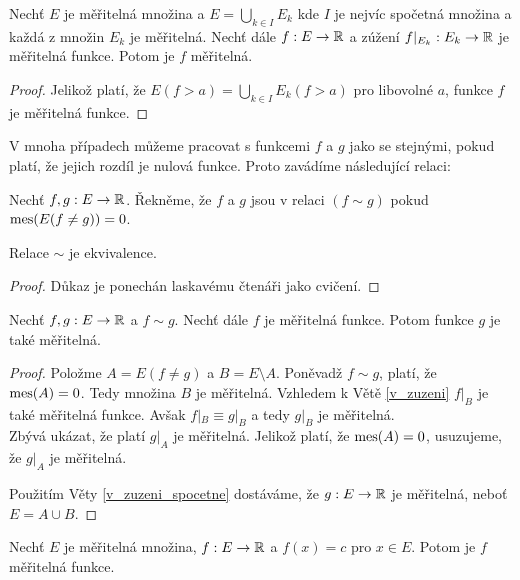 \begin{theorem}
Nechť $E$ je měřitelná množina a $E=\bigcup\limits_{k \in I} E_k$ kde $I$ je nejvíc spočetná množina a každá z množin $E_k$ je měřitelná.
Nechť dále $f:E \to \mathbb{R}$ a zúžení $f|_{E_k}:E_k \to \mathbb{R}$ je měřitelná funkce.
Potom je $f$ měřitelná.
\label{v_zuzeni_spocetne}
\end{theorem}

\begin{proof}
Jelikož platí, že $E(f>a)=\bigcup\limits_{k \in I} E_k(f>a)$ pro libovolné $a$, funkce $f$ je měřitelná funkce.
\end{proof}

V mnoha případech můžeme pracovat s funkcemi $f$ a $g$ jako se stejnými, pokud platí, že jejich rozdíl je nulová funkce. Proto zavádíme následující relaci: 
\begin{definition}
Nechť $f,g :E \to \mathbb{R}$.
Řekněme, že $f$ a $g$ jsou v relaci $(f \sim g)$ pokud $\operatorname{mes}(E(f \neq g)) =0$.
\end{definition}

\begin{theorem}
Relace $\sim$ je ekvivalence.
\end{theorem}
\begin{proof}
D\r ukaz je ponechán laskavému čtenáři jako cvičení.
\end{proof}

\begin{theorem}
Nechť $f,g : E \to \mathbb{R}$ a $f \sim g$.
Nechť dále $f$ je měřitelná funkce.
Potom funkce $g$ je také měřitelná.
\end{theorem}

\begin{proof}
Položme $A=E(f \neq g)$ a $B=E \setminus A$. Poněvadž $f \sim g$, platí, že $\operatorname{mes}(A)=0$.
Tedy množina $B$ je měřitelná.
Vzhledem k Větě \ref{v_zuzeni} $f\big|_B$ je také měřitelná funkce.
Avšak $f|_B \equiv g|_B$ a tedy $g|_B$ je měřitelná. \\
Zbývá ukázat, že platí $g\big|_A$ je měřitelná.
Jelikož platí, že $\operatorname{mes}(A)=0$, usuzujeme, že $g\big|_A$ je měřitelná.

Použitím Věty \ref{v_zuzeni_spocetne} dostáváme, že $g:E \to \mathbb{R}$ je měřitelná, neboť $E=A \cup B$.
\end{proof}

\begin{theorem}
Nechť $E$ je měřitelná množina, $f:E \to \mathbb{R}$ a $f(x)=c$ pro $x \in E$. Potom je $f$ měřitelná funkce.
\label{v_konstanta}
\end{theorem}

